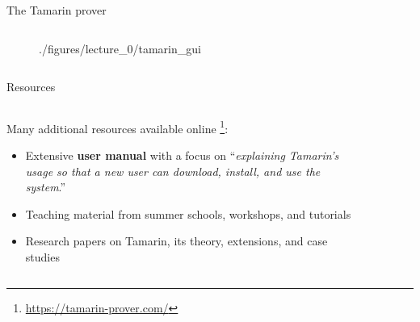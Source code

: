 \documentclass[11pt,aspectratio=169]{beamer}
\begin{document}
\begin{frame}[fragile]{The Tamarin prover}
\begin{columns}
\begin{column}{0.4\textwidth}
\begin{figure}
                    {./figures/lecture_0/tamarin_gui}
            \end{figure}
        \end{column}
    \end{columns}
    \setcounter{footnote}{0}
\end{frame}

\begin{frame}[fragile]{Resources}
    \begin{columns}
        \begin{column}{0.6\textwidth}
            Many additional resources available online
            \footnote[1,frame]{\url{https://tamarin-prover.com/}}:
            \begin{itemize}
                \item Extensive \textbf{user manual} with a focus on
                      ``\textit{explaining Tamarin's usage so that a new user 
                      can download, install, and use the system}.''
                \item Teaching material from summer schools, workshops, and 
                      tutorials
                \item Research papers on Tamarin, its theory, extensions, and 
                      case studies
            \end{itemize}
        \end{column}
        \begin{column}{0.4\textwidth}
            \begin{figure}
            \end{figure}
        \end{column}
    \end{columns}
\end{frame}
\end{document}
